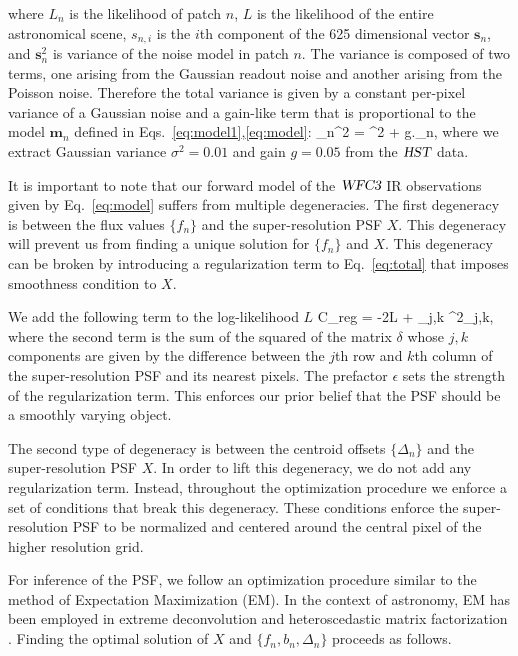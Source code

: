 where $L_{n}$ is the likelihood of patch $n$, $L$ is the likelihood of the entire astronomical scene, $s_{n,i}$ is the $i$th component of the 625 dimensional vector $\mathbf{s}_n$, and 
$\mathbf{s}_n^{2}$ is variance of the noise model in patch $n$. The variance is composed of two terms, one arising from the Gaussian readout noise and another arising from the Poisson noise.
Therefore the total variance is given by a constant per-pixel variance of a Gaussian noise and a gain-like term that is proportional to the model $\mathbf{m}_{n}$ defined in Eqs.~\ref{eq:model1},\ref{eq:model}:
\beq
{}_n^{2} = \sigma^{2} + g._{n},
\label{eq:variance}
\eeq
where we extract Gaussian variance $\sigma^{2}=0.01$ and gain $g=0.05$ from the ${\textsl{HST}}$ data. 

It is important to note that our forward model of the ${\textsl{WFC3}}$ IR 
observations given by Eq.~\ref{eq:model} suffers from multiple degeneracies. The first degeneracy is between 
the flux values $\{f_n\}$ and the super-resolution PSF $X$. This degeneracy will prevent us from finding a unique 
solution for $\{f_n\}$ and $X$. This degeneracy can be broken by introducing a regularization term to Eq.~\ref{eq:total} that imposes 
smoothness condition to $X$. 

We add the following term to the log-likelihood $L$
\beq
C_{\rm reg} = -2\ln L + \epsilon \sum_{j,k} \delta^{2}_{j,k},
\label{eq:reg}
\eeq
where the second term is the sum of the squared of the matrix $\delta$ whose $j,k$ components are given by the difference between the $j$th row and $k$th column of the super-resolution PSF 
and its nearest pixels. The prefactor $\epsilon$ sets the strength of the regularization term. This enforces our prior belief that the PSF should be a smoothly varying object.

The second type of degeneracy is between the centroid offsets $\{\Delta_n\}$ and the super-resolution PSF $X$. In order to lift this degeneracy, we do not add any regularization 
term. Instead, throughout the optimization procedure we enforce a set of conditions that break this degeneracy. These conditions enforce the super-resolution 
PSF to be normalized and centered around the central pixel of the higher resolution grid. 

For inference of the PSF, we follow an optimization procedure similar to the method of Expectation Maximization (EM). In the context of astronomy, EM has been employed in extreme deconvolution \citep{xd} and heteroscedastic matrix factorization \citep{hmf}. Finding the optimal solution of 
$X$ and $\{f_n , b_n , \Delta_n\}$ proceeds as follows. 

